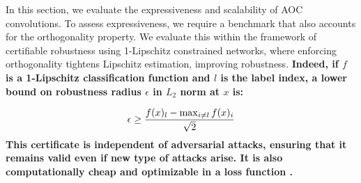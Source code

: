 



In this section, we evaluate the expressiveness and scalability of AOC convolutions. To assess expressiveness, we require a benchmark that also accounts for the orthogonality property. 
We evaluate this within the framework of 
certifiable robustness using 1-Lipschitz constrained networks, where enforcing orthogonality tightens Lipschitz estimation, improving robustness.
\iffalse
\textbf{Indeed, if $f$ is a 1-Lipschitz classification function and $l$ is the label index, a lower bound on robustness radius $ \epsilon$ in $L_2$ norm at $x$ is:}

\vspace{-3mm}
\[
    \epsilon \geq \frac{f(x)_l - \max_{i \neq l}f(x)_i}{\sqrt{2}}
    \vspace{-2mm}
\]
\textbf{This certificate is independent of adversarial attacks, ensuring that it remains valid even if new type of attacks arise. It is also computationally cheap and optimizable in a loss function \cite{singla_improved_2022, hu_recipe_2023}.}

